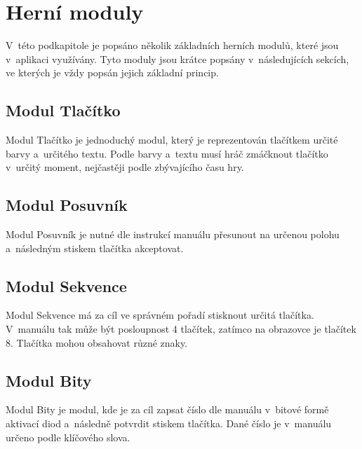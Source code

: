 \section{Herní moduly}

V~této podkapitole je popsáno několik základních herních modulů,
které jsou v~aplikaci využívány.
Tyto moduly jsou krátce popsány v~následujících sekcích,
ve kterých je vždy popsán jejich základní princip.

\subsection{Modul Tlačítko}

Modul Tlačítko je jednoduchý modul,
který je reprezentován tlačítkem určité barvy a~určitého textu.
Podle barvy a~textu musí hráč zmáčknout tlačítko v~určitý moment,
nejčastěji podle zbývajícího času hry.

\subsection{Modul Posuvník}

Modul Posuvník je nutné dle instrukcí manuálu přesunout na určenou polohu
a~následným stiskem tlačítka akceptovat.

\subsection{Modul Sekvence}

Modul Sekvence má za cíl ve správném pořadí stisknout určitá tlačítka.
V~manuálu tak může být posloupnost 4 tlačítek,
zatímco na obrazovce je tlačítek 8.
Tlačítka mohou obsahovat různé znaky.

\subsection{Modul Bity}

Modul Bity je modul,
kde je za cíl zapsat číslo dle manuálu v~bitové formě aktivací diod
a~následně potvrdit stiskem tlačítka.
Dané číslo je v~manuálu určeno podle klíčového slova.
